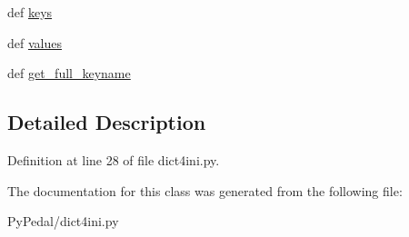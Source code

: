 \begin{CompactItemize}
\item 
\hypertarget{classPyPedal_1_1dict4ini_1_1DictNode_e5849abacc11081b6803e6bb363c2487}{
def \hyperlink{classPyPedal_1_1dict4ini_1_1DictNode_e5849abacc11081b6803e6bb363c2487}{keys}}
\label{classPyPedal_1_1dict4ini_1_1DictNode_e5849abacc11081b6803e6bb363c2487}

\item 
\hypertarget{classPyPedal_1_1dict4ini_1_1DictNode_0f1b0b6bf36a63181e59c9f2b58b9831}{
def \hyperlink{classPyPedal_1_1dict4ini_1_1DictNode_0f1b0b6bf36a63181e59c9f2b58b9831}{values}}
\label{classPyPedal_1_1dict4ini_1_1DictNode_0f1b0b6bf36a63181e59c9f2b58b9831}

\item 
\hypertarget{classPyPedal_1_1dict4ini_1_1DictNode_2989313602f975584df2f6001b86cc5a}{
def \hyperlink{classPyPedal_1_1dict4ini_1_1DictNode_2989313602f975584df2f6001b86cc5a}{get\_\-full\_\-keyname}}
\label{classPyPedal_1_1dict4ini_1_1DictNode_2989313602f975584df2f6001b86cc5a}

\end{CompactItemize}


\subsection{Detailed Description}


Definition at line 28 of file dict4ini.py.

The documentation for this class was generated from the following file:\begin{CompactItemize}
\item 
PyPedal/dict4ini.py\end{CompactItemize}
